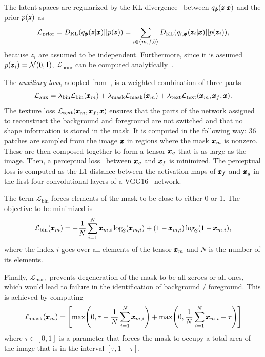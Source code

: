 The latent spaces are regularized by the KL divergence~\cite{kingma2013vae} between $q_{\pmb{{\phi}}} (\pmb{{z}} \vert \pmb{{x}})$ and the prior $p(\pmb{{z}})$ as
\begin{equation} \label{eq:kldloss}
    \mathcal{L}_{\text{prior}} = D_\text{KL} (q_{\pmb{{\phi}}} (\pmb{{z}} \vert \pmb{{x}}) \vert \vert p(\pmb{{z}})) = \sum_{i \in \lbrace m, f, b \rbrace} D_\text{KL} (q_{i,\pmb{{\phi}}} (\pmb{{z}}_i  \vert \pmb{{x}}) \vert\vert p(\pmb{{z}}_i)),
\end{equation} 
because $z_i$ are assumed to be independent. Furthermore, since it is assumed $p(\pmb{{z}}_i) = \mathcal{N}(0,\mathbf{I})$, $\mathcal{L}_{\text{prior}}$ can be computed analytically~\cite{kingma2013vae}.

The \emph{auxiliary loss}, adopted from~\cite{sauer2021counterfactual}, is a weighted combination of three parts
\begin{equation} \label{eq:auxloss}
    \mathcal{L}_{\text{aux}} = \lambda_{\text{bin}}\mathcal{L}_{\text{bin}}(\pmb{{x}}_m) + \lambda_{\text{mask}}\mathcal{L}_{\text{mask}}(\pmb{{x}}_m) + \lambda_{\text{text}}\mathcal{L}_{\text{text}}(\pmb{{x}}_m,\pmb{{x}}_f,\pmb{{x}}).
\end{equation} 
The texture loss $\mathcal{L}_{\text{text}}(\pmb{{x}}_m,\pmb{{x}}_f,\pmb{{x}})$ ensures that the parts of the network assigned to reconstruct the background and foreground are not switched and that no shape information is stored in the mask. It is computed in the following way: 36 patches are sampled from the image $\pmb{{x}}$ in regions where the mask $\pmb{{x}}_m$ is nonzero. These are then composed together to form a tensor $\pmb{{x}}_g$ that is as large as the image. Then, a perceptual loss~\cite{johnson2016perceptual} between $\pmb{{x}}_g$ and $\pmb{{x}}_f$ is minimized. The perceptual loss is computed as the L1 distance between the activation maps of $\pmb{{x}}_f$ and $\pmb{{x}}_g$ in the first four convolutional layers of a VGG16~\cite{simonyan2014very} network.

The term $\mathcal{L}_{\text{bin}}$ forces elements of the mask to be close to either 0 or 1. The objective to be minimized is
\begin{equation}
    \mathcal{L}_{\text{bin}}(\pmb{{x}}_m) = - \frac{1}{N} \sum_{i=1}^N \pmb{{x}}_{m,i} \log_2(\pmb{{x}}_{m,i}) + (1-\pmb{{x}}_{m,i}) \log_2(1 - \pmb{{x}}_{m,i}),
\end{equation}
where the index $i$ goes over all elements of the tensor $\pmb{{x}}_m$ and $N$ is the number of its elements.

 Finally, $\mathcal{L}_{\text{mask}}$ prevents degeneration of the mask to be all zeroes or all ones, which would lead to failure in the identification of background / foreground. This is achieved by computing
  \begin{equation}
    \mathcal{L}_{\text{mask}}(\vc{x}_m) = \left[ \max \left( 0, \tau - \frac{1}{N} \sum_{i=1}^N \vc{x}_{m,i} \right) + \max \left( 0, \frac{1}{N} \sum_{i=1}^N \vc{x}_{m,i} -\tau  \right) \right]
\end{equation}
where $\tau \in [0,1]$ is a parameter that forces the mask to occupy a total area of the image that is in the interval $[\tau, 1-\tau]$. 

